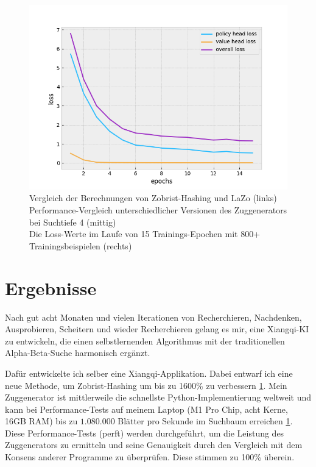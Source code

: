 \documentclass[
  manuscript=article,  %
  layout=publish,  %
  year=2023,
  volume=1,
]{extra/joas}
\begin{document}
\begin{figure}
\begin{minipage}[c]{0.32\textwidth}
      \includegraphics[width={\textwidth}]{imgs/loss.png}
  \end{minipage}
  \captionsetup{justification=centering}
  \caption{Vergleich der Berechnungen von Zobrist-Hashing und LaZo (links) \\ Performance-Vergleich unterschiedlicher Versionen des Zuggenerators bei Suchtiefe 4 (mittig) \\ Die Loss-Werte im Laufe von 15 Trainings-Epochen mit 800+ Trainingsbeispielen (rechts)}
  \label{fig:results}
\end{figure}

\section{Ergebnisse}
Nach gut acht Monaten und vielen Iterationen von Recherchieren, Nachdenken, Ausprobieren, Scheitern und wieder Recherchieren gelang es mir, eine Xiangqi-KI zu entwickeln, die einen selbstlernenden Algorithmus mit der traditionellen Alpha-Beta-Suche harmonisch ergänzt. 

Dafür entwickelte ich selber eine Xiangqi-Applikation. Dabei entwarf ich eine neue Methode, um Zobrist-Hashing um bis zu 1600\% zu verbessern \ref{fig:results}. Mein Zuggenerator ist mittlerweile die schnellste Python-Implementierung weltweit und kann bei Performance-Tests auf meinem Laptop (M1 Pro Chip, acht Kerne, 16GB RAM) bis zu $1.080.000$ Blätter pro Sekunde im Suchbaum erreichen \ref{fig:results}. Diese Performance-Tests (perft) werden durchgeführt, um die Leistung des Zuggenerators zu ermitteln und seine Genauigkeit durch den Vergleich mit dem Konsens anderer Programme zu überprüfen. Diese stimmen zu 100\% überein. 
\end{document}
